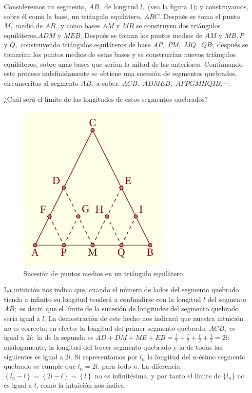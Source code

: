 \documentclass[oneside,english,spanish,2m,twoside,svgnames,x11names,HTML,twoside,12pt]{libro-matua}\usepackage[]{graphicx}\usepackage[]{color}
\begin{document}
\begin{ejemplo}

Consideremos un segmento, $AB,$ de longitud $l,$ (vea la figura
\ref{fig:cal_lim8}); y construyamos, sobre él como la base, un triángulo
equilátero, $ABC.$ Después se toma el punto $M,$ medio de $AB,$
y como bases $AM$ y $MB$ se construyen dos triángulos equiláteros,$ADM$
y $MEB.$ Después se toman los puntos medios de $AM$ y $MB,$$P$
y $Q,$ construyendo triángulos equiláteros de base $AP,$ $PM,$
$MQ,$ $QB;$ después se tomarían los puntos medios de estas bases
y se construirían nuevos triángulos equiláteros, sobre unas bases
que serían la mitad de las anteriores. Continuando este proceso indefinidamente
se obtiene una sucesión de segmentos quebrados, circunscritas al segmento
$AB,$ a saber: $ACB,$ $ADMEB,$ $AFPGMHQIB,\cdots.$ 

¿Cuál será el límite de las longitudes de estos segmentos quebrados? 

\begin{figure}[H] \centering

\includegraphics{10_home_antalcides_MEGA_calculo_I_libro_pdf_cal_lim8.pdf}
\caption{Sucesi\'on de puntos medios en un triángulo equilátero}
\label{fig:cal_lim8} \end{figure}

\end{ejemplo}

\sol La intuición nos indica que, cuando el número de lados del segmento
quebrado tienda a infinito su longitud tenderá a confundirse con la
longitud $l$ del segmento $AB;$ es decir, que el límite de la sucesión
de longitudes del segmento quebrado sería igual a $l.$ La demostración
de este hecho nos indicará que nuestra intuición no es correcta; en
efecto: la longitud del primer segmento quebrado, $ACB,$ es igual
a $2l;$ la de la segunda es $AD+DM+ME+EB=\frac{l}{2}+\frac{l}{2}+\frac{l}{2}+\frac{l}{2}=2l;$
análogamente, la longitud del tercer segmento quebrado y la de todas
las siguientes es igual a $2l$. Si representamos por $l_{n}$ la
longitud del n-ésimo segmento quebrado se cumple que $l_{n}=2l.$
para todo $n.$ La diferencia $\left\{ l_{n}-l\right\} =\left\{ 2l-l\right\} =\left\{ l\right\} $
no es infinitésima, y por tanto el límite de $\{l_{n}\}$ no es igual
a $l$, como la intuición nos indica.
\end{document}
